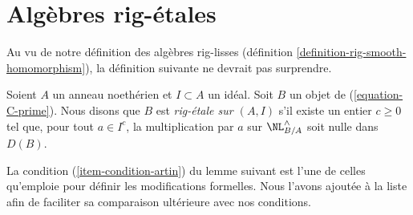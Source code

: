 \section{Algèbres rig-étales}
\label{section-rig-etale}

\noindent
Au vu de notre définition des algèbres rig-lisses (définition
\ref{definition-rig-smooth-homomorphism}), la définition suivante ne devrait
pas surprendre.

\begin{definition}
\label{definition-rig-etale-homomorphism}
Soient $A$ un anneau noethérien et $I \subset A$ un idéal. Soit $B$ un objet
de (\ref{equation-C-prime}). Nous disons que $B$ est {\it rig-étale sur
$(A, I)$} s'il existe un entier $c \geq 0$ tel que, pour tout $a \in I^c$, la
multiplication par $a$ sur $\NL_{B/A}^\wedge$ soit nulle dans $D(B)$.
\end{definition}

\noindent
La condition (\ref{item-condition-artin}) du lemme suivant est l'une de celles
qu'emploie \cite{ArtinII} pour définir les modifications formelles. Nous
l'avons ajoutée à la liste afin de faciliter sa comparaison ultérieure avec
nos conditions.

